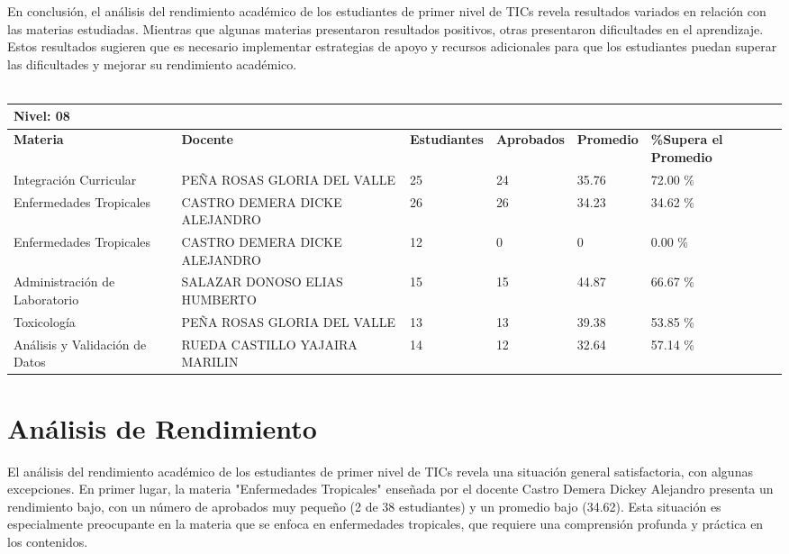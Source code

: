 En conclusión, el análisis del rendimiento académico de los estudiantes de primer nivel de TICs revela resultados variados en relación con las materias estudiadas. Mientras que algunas materias presentaron resultados positivos, otras presentaron dificultades en el aprendizaje. Estos resultados sugieren que es necesario implementar estrategias de apoyo y recursos adicionales para que los estudiantes puedan superar las dificultades y mejorar su rendimiento académico.\\
\vspace{1cm}\\\small
\begin{tabularx}{\textwidth}{|p{2.5cm}|p{2.5cm}|X|X|X|X|}
\hline
\multicolumn{6}{|X|}{\textbf{Nivel: 08 }}\\\hline\textbf{Materia} & \textbf{Docente} & \textbf{Estudiantes} & \textbf{Aprobados} & \textbf{Promedio} & \textbf{\%Supera el Promedio} \\ \hline
Integración Curricular & PEÑA ROSAS GLORIA DEL VALLE & 25 & 24 & 35.76 & 72.00 \%\\ \hline
Enfermedades Tropicales & CASTRO DEMERA DICKE ALEJANDRO & 26 & 26 & 34.23 & 34.62 \%\\ \hline
Enfermedades Tropicales & CASTRO DEMERA DICKE ALEJANDRO & 12 & 0 & 0 & 0.00 \%\\ \hline
Administración de Laboratorio & SALAZAR DONOSO ELIAS HUMBERTO & 15 & 15 & 44.87 & 66.67 \%\\ \hline
Toxicología & PEÑA ROSAS GLORIA DEL VALLE & 13 & 13 & 39.38 & 53.85 \%\\ \hline
Análisis y Validación de Datos & RUEDA CASTILLO YAJAIRA MARILIN & 14 & 12 & 32.64 & 57.14 \%\\ \hline
\end{tabularx}

\vspace{1cm}
\section{Análisis de Rendimiento}
El análisis del rendimiento académico de los estudiantes de primer nivel de TICs revela una situación general satisfactoria, con algunas excepciones. En primer lugar, la materia "Enfermedades Tropicales" enseñada por el docente Castro Demera Dickey Alejandro presenta un rendimiento bajo, con un número de aprobados muy pequeño (2 de 38 estudiantes) y un promedio bajo (34.62). Esta situación es especialmente preocupante en la materia que se enfoca en enfermedades tropicales, que requiere una comprensión profunda y práctica en los contenidos.


